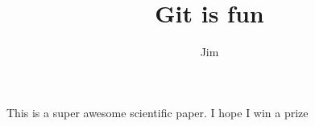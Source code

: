 \documentclass{10pt}{article}
\author{Jim}
\title{Git is fun}
\begin{document}
    \maketitle

    This is a super awesome scientific paper.
    I hope I win a prize
\end{document}
